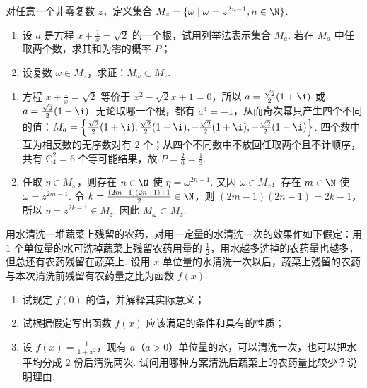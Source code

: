 \begin{problem}
对任意一个非零复数 \(z\)，定义集合 \(M_z=\{\omega\mid\omega=z^{2n-1},n\in\N\}\).

\begin{enumerate}
\item 设 \(a\) 是方程 \(x+\frac1x=\sqrt2\) 的一个根，试用列举法表示集合 \(M_a\). 若在 \(M_a\) 中任取两个数，求其和为零的概率 \(P\)；
\item 设复数 \(\omega\in M_z\)，求证：\(M_\omega\subset M_z\).
\end{enumerate}
\end{problem}

\begin{solution}
\begin{enumerate}
\item 方程 \(x+\frac1x=\sqrt2\) 等价于 \(x^2-\sqrt2x+1=0\)，所以 \(a=\frac{\sqrt2}{2}(1+\i)\) 或 \(a=\frac{\sqrt2}{2}(1-\i)\). 无论取哪一个根，都有 \(a^4=-1\)，从而奇次幂只产生四个不同的值：\(M_a=\left\{\frac{\sqrt2}{2}(1+\i),\frac{\sqrt2}{2}(1-\i),-\frac{\sqrt2}{2}(1+\i),-\frac{\sqrt2}{2}(1-\i)\right\}\). 四个数中互为相反数的无序数对有 \(2\) 个；从四个不同数中不放回任取两个且不计顺序，共有 \(\mathrm C_4^2=6\) 个等可能结果，故 \(P=\frac{2}{6}=\frac13\).
\item 任取 \(\eta\in M_\omega\)，则存在 \(n\in\N\) 使 \(\eta=\omega^{2n-1}\). 又因 \(\omega\in M_z\)，存在 \(m\in\N\) 使 \(\omega=z^{2m-1}\). 令 \(k=\frac{(2m-1)(2n-1)+1}{2}\in\N\)，则 \((2m-1)(2n-1)=2k-1\)，所以 \(\eta=z^{2k-1}\in M_z\). 因此 \(M_\omega\subset M_z\).
\end{enumerate}
\end{solution}

\begin{problem}
用水清洗一堆蔬菜上残留的农药，对用一定量的水清洗一次的效果作如下假定：用 \(1\) 个单位量的水可洗掉蔬菜上残留农药用量的 \(\frac12\)，用水越多洗掉的农药量也越多，但总还有农药残留在蔬菜上. 设用 \(x\) 单位量的水清洗一次以后，蔬菜上残留的农药与本次清洗前残留有农药量之比为函数 \(f(x)\).

\begin{enumerate}
\item 试规定 \(f(0)\) 的值，并解释其实际意义；
\item 试根据假定写出函数 \(f(x)\) 应该满足的条件和具有的性质；
\item 设 \(f(x)=\frac{1}{1+x^2}\)，现有 \(a\)（\(a>0\)）单位量的水，可以清洗一次，也可以把水平均分成 \(2\) 份后清洗两次. 试问用哪种方案清洗后蔬菜上的农药量比较少？说明理由.
\end{enumerate}
\end{problem}

